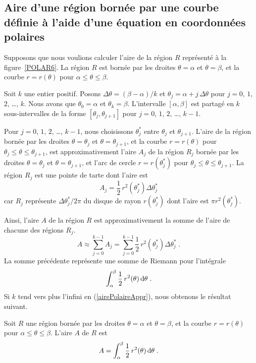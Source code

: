 {\subsection[Aire d'une région]{Aire d'une région bornée par une courbe  définie à l'aide d'une équation en coordonnées polaires}

Supposons que nous voulions calculer l'aire de la région $R$
représenté à la figure~\ref{POLAR6}.  La région $R$ est bornée par les
droites $\theta=\alpha$ et $\theta = \beta$, et la courbe
$r=r(\theta)$ pour $\alpha \leq \theta \leq \beta$. 

Soit $k$ une entier positif.  Posons $\Delta \theta =(\beta-\alpha)/k$
et $\theta_j = \alpha + j\,\Delta \theta$ pour $j=0$, $1$, $2$,
\ldots, $k$.  Nous avons que $\theta_0=\alpha$ et $\theta_k = \beta$.
L'intervalle $[\alpha,\beta]$ est partagé en $k$ sous-intervalles de la
forme $[\theta_j,\theta_{j+1}]$ pour $j=0$, $1$, $2$, \ldots, $k-1$.

Pour $j=0$, $1$, $2$, \ldots, $k-1$, nous choisissons $\theta_j^\ast$ entre
$\theta_j$ et $\theta_{j+1}$.  L'aire de la région bornée par les
droites $\theta=\theta_j$ et $\theta=\theta_{j+1}$, et la courbe
$r=r(\theta)$ pour $\theta_j \leq \theta \leq \theta_{j+1}$, est
approximativement l'aire $A_j$ de la région $R_j$ bornée par les
droites $\theta=\theta_j$ et $\theta=\theta_{j+1}$, et l'arc de cercle
$r=r(\theta_j^\ast)$ pour $\theta_j \leq \theta \leq \theta_{j+1}$.
La région $R_j$ est une pointe de tarte dont l'aire est
\[
A_j = \frac{1}{2}\,r^2(\theta_j^\ast) \Delta \theta_j^\ast
\]
car $R_j$ représente $\Delta \theta_j^\ast/2\pi$ du disque de rayon
$r(\theta_j^\ast)$ dont l'aire est $\displaystyle \pi r^2(\theta_j^\ast)$.

Ainsi, l'aire $A$ de la région $R$ est approximativement la somme de
l'aire de chacune des régions $R_j$.
\begin{equation} \label{airePolaireAppr}
A \approx \sum_{j=0}^{k-1} A_j = \sum_{j=0}^{k-1}
\frac{1}{2}\,r^2(\theta_j^\ast) \Delta \theta_j^\ast \; .
\end{equation}
La somme précédente représente une somme de Riemann pour l'intégrale
\[
\int_\alpha^\beta \frac{1}{2}\, r^2(\theta) \,\mathrm{d}\theta \; .
\]
Si $k$ tend vers plus l'infini en (\ref{airePolaireAppr}), nous obtenons
le résultat suivant.

\begin{focus}{\prp}
Soit $R$ une région bornée par les droites $\theta=\alpha$ et
$\theta = \beta$, et la courbe $r=r(\theta)$ pour
$\alpha \leq \theta \leq \beta$.  L'aire $A$ de $R$ est
\[
A = \int_\alpha^\beta \frac{1}{2}\, r^2(\theta) \,\mathrm{d}\theta \; .
\]
\end{focus}

}
